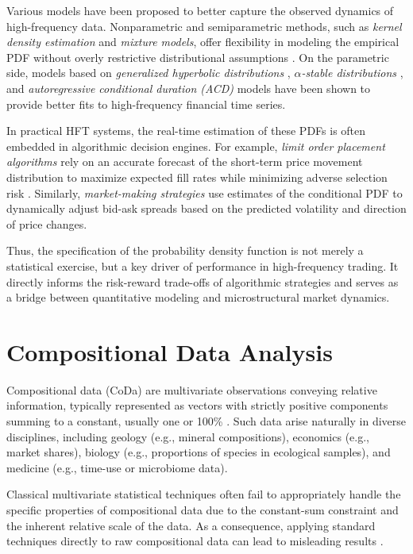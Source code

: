 \documentclass[
	12pt,				%
	oneside,			%
	a4paper,			%
	english,			%
	brazil				%
	]{abntex2ppgsi}
\begin{document}
Various models have been proposed to better capture the observed dynamics of high-frequency data. Nonparametric and semiparametric methods, such as \textit{kernel density estimation} and \textit{mixture models}, offer flexibility in modeling the empirical PDF without overly restrictive distributional assumptions . On the parametric side, models based on \textit{generalized hyperbolic distributions} , \textit{$\alpha$-stable distributions} , and \textit{autoregressive conditional duration (ACD)} models  have been shown to provide better fits to high-frequency financial time series.

In practical HFT systems, the real-time estimation of these PDFs is often embedded in algorithmic decision engines. For example, \textit{limit order placement algorithms} rely on an accurate forecast of the short-term price movement distribution to maximize expected fill rates while minimizing adverse selection risk . Similarly, \textit{market-making strategies} use estimates of the conditional PDF to dynamically adjust bid-ask spreads based on the predicted volatility and direction of price changes.

Thus, the specification of the probability density function is not merely a statistical exercise, but a key driver of performance in high-frequency trading. It directly informs the risk-reward trade-offs of algorithmic strategies and serves as a bridge between quantitative modeling and microstructural market dynamics.

\section{Compositional Data Analysis}
Compositional data (CoDa) are multivariate observations conveying relative information, typically represented as vectors with strictly positive components summing to a constant, usually one or 100\% \cite{aitchison1982statistical}. Such data arise naturally in diverse disciplines, including geology (e.g., mineral compositions), economics (e.g., market shares), biology (e.g., proportions of species in ecological samples), and medicine (e.g., time-use or microbiome data).

Classical multivariate statistical techniques often fail to appropriately handle the specific properties of compositional data due to the constant-sum constraint and the inherent relative scale of the data. As a consequence, applying standard techniques directly to raw compositional data can lead to misleading results \cite{pawlowsky2015modelling}.
\end{document}
